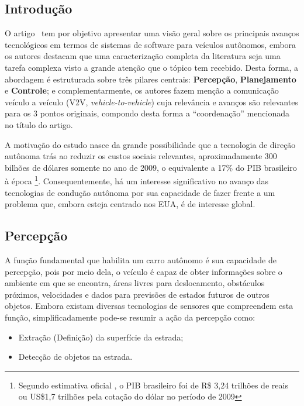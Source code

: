 \subsection{Introdução}

O artigo~\parencite{Pendleton2017Autonomous} tem por objetivo apresentar uma visão geral sobre os principais avanços tecnológicos em termos de sistemas de software para veículos autônomos, embora os autores destacam que uma caracterização completa da literatura seja uma tarefa complexa visto a grande atenção que o tópico tem recebido. Desta forma, a abordagem é estruturada sobre três pilares centrais: \textbf{Percepção}, \textbf{Planejamento} e \textbf{Controle}; e complementarmente, os autores fazem menção a comunicação veículo a veículo (V2V, \textit{vehicle-to-vehicle}) cuja relevância e avanços são relevantes para os 3 pontos originais, compondo desta forma a ``coordenação'' mencionada no título do artigo. 

A motivação do estudo nasce da grande possibilidade que a tecnologia de direção autônoma trás ao reduzir os custos sociais relevantes, aproximadamente 300 bilhões de dólares somente no ano de 2009, o equivalente a 17\% do PIB brasileiro à época \footnote{Segundo estimativa oficial \parencite{IBGE2009PIB}, o PIB brasileiro foi de R\$ 3,24 trilhões de reais ou US\$1,7 trilhões pela cotação do dólar no período de 2009}. Consequentemente, há um interesse significativo no avanço das tecnologias de condução autônoma por sua capacidade de fazer frente a um problema que, embora esteja centrado nos EUA, é de interesse global.

\subsection{Percepção}

A função fundamental que habilita um carro autônomo é sua capacidade de percepção, pois por meio dela, o veículo é capaz de obter informações sobre o ambiente em que se encontra, áreas livres para deslocamento, obstáculos próximos, velocidades e dados para previsões de estados futuros de outros objetos. Embora existam diversas tecnologias de sensores que compreendem esta função, simplificadamente pode-se resumir a ação da percepção como:
\begin{itemize}
    \item Extração (Definição) da superfície da estrada;
    \item Detecção de objetos na estrada.
\end{itemize}

